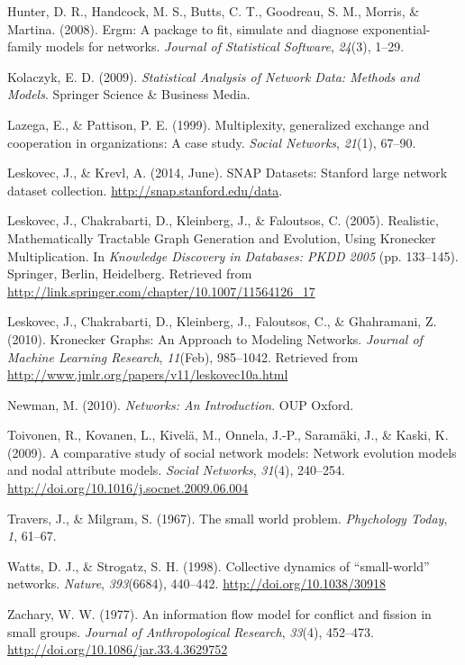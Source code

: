 \documentclass[12pt,twoside]{amherstthesis}
\begin{document}
  \hypertarget{ref-ergmpackagearticle}{}
  Hunter, D. R., Handcock, M. S., Butts, C. T., Goodreau, S. M., Morris,
  \& Martina. (2008). Ergm: A package to fit, simulate and diagnose
  exponential-family models for networks. \emph{Journal of Statistical
  Software}, \emph{24}(3), 1--29.
  
  \hypertarget{ref-kolaczyk_statistical_2009}{}
  Kolaczyk, E. D. (2009). \emph{Statistical Analysis of Network Data:
  Methods and Models}. Springer Science \& Business Media.
  
  \hypertarget{ref-lazega1999multiplexity}{}
  Lazega, E., \& Pattison, P. E. (1999). Multiplexity, generalized
  exchange and cooperation in organizations: A case study. \emph{Social
  Networks}, \emph{21}(1), 67--90.
  
  \hypertarget{ref-snapnets}{}
  Leskovec, J., \& Krevl, A. (2014, June). SNAP Datasets: Stanford large
  network dataset collection. \url{http://snap.stanford.edu/data}.
  
  \hypertarget{ref-leskovec_realistic_2005}{}
  Leskovec, J., Chakrabarti, D., Kleinberg, J., \& Faloutsos, C. (2005).
  Realistic, Mathematically Tractable Graph Generation and Evolution,
  Using Kronecker Multiplication. In \emph{Knowledge Discovery in
  Databases: PKDD 2005} (pp. 133--145). Springer, Berlin, Heidelberg.
  Retrieved from
  \url{http://link.springer.com/chapter/10.1007/11564126_17}
  
  \hypertarget{ref-leskovec_kronecker_2010}{}
  Leskovec, J., Chakrabarti, D., Kleinberg, J., Faloutsos, C., \&
  Ghahramani, Z. (2010). Kronecker Graphs: An Approach to Modeling
  Networks. \emph{Journal of Machine Learning Research}, \emph{11}(Feb),
  985--1042. Retrieved from
  \url{http://www.jmlr.org/papers/v11/leskovec10a.html}
  
  \hypertarget{ref-newman_networks:_2010}{}
  Newman, M. (2010). \emph{Networks: An Introduction}. OUP Oxford.
  
  \hypertarget{ref-toivonen_comparative_2009}{}
  Toivonen, R., Kovanen, L., Kivelä, M., Onnela, J.-P., Saramäki, J., \&
  Kaski, K. (2009). A comparative study of social network models: Network
  evolution models and nodal attribute models. \emph{Social Networks},
  \emph{31}(4), 240--254.
  \url{http://doi.org/10.1016/j.socnet.2009.06.004}
  
  \hypertarget{ref-travers1967small}{}
  Travers, J., \& Milgram, S. (1967). The small world problem.
  \emph{Phychology Today}, \emph{1}, 61--67.
  
  \hypertarget{ref-watts_collective_1998}{}
  Watts, D. J., \& Strogatz, S. H. (1998). Collective dynamics of
  ``small-world'' networks. \emph{Nature}, \emph{393}(6684), 440--442.
  \url{http://doi.org/10.1038/30918}
  
  \hypertarget{ref-zachskarateclub}{}
  Zachary, W. W. (1977). An information flow model for conflict and
  fission in small groups. \emph{Journal of Anthropological Research},
  \emph{33}(4), 452--473. \url{http://doi.org/10.1086/jar.33.4.3629752}


\end{document}
